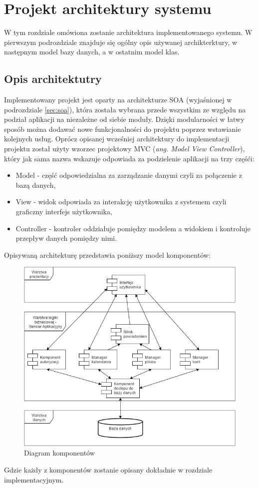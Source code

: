 \chapter{Projekt architektury systemu}
\label{cha:projektSystemu}
W tym rozdziale omówiona zostanie architektura implementowanego systemu. W pierwszym podrozdziale znajduje się ogólny opis używanej archikterktury, w następnym model bazy danych, a w ostatnim model klas.
\section{Opis architektutry}
Implementowany projekt jest oparty na architekturze SOA (wyjaśnionej w podrozdziale \ref{sec:soa}), która została wybrana przede wszystkim ze względu na podział aplikacji na niezależne od siebie moduły. Dzięki modularności w łatwy sposób można dodawać nowe funkcjonalności do projektu poprzez wstawianie kolejnych usług. Oprócz opisanej wcześniej architektury do implementacji projektu został użyty wzorzec projektowy MVC (\textit{ang. Model View Controller}), który jak sama nazwa wskazuje odpowiada za podzielenie aplikacji na trzy częśći:
\begin{itemize}
	\item Model - część odpowiedzialna za zarządzanie danymi czyli za połączenie z bazą danych,
	\item View - widok odpowiada za interakcję użytkownika z systemem czyli graficzny interfejs użytkownika,
	\item Controller - kontroler oddziałuje pomiędzy modelem a widokiem i kontroluje przepływ danych pomiędzy nimi. \cite{MVC01}
\end{itemize}

Opisywaną architekturę przedstawia poniższy model komponentów:
\begin{figure}[H]
\centering
\includegraphics[scale=0.5]{ArchitekturaSystemu}
\caption{\label{fig:diag_01}Diagram komponentów}
\end{figure}
Gdzie każdy z komponentów zostanie opisany dokładnie w rozdziale implementacyjnym.


